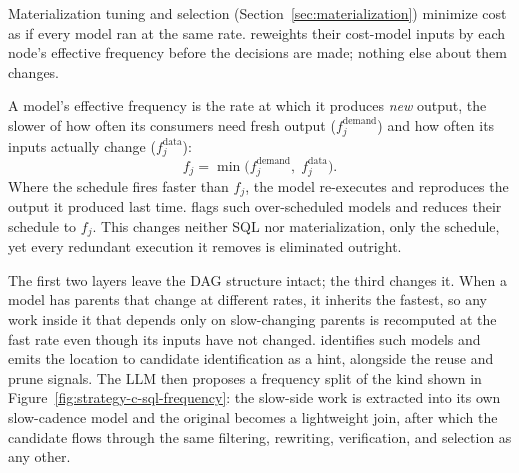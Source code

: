 Materialization tuning and selection (Section~\ref{sec:materialization}) minimize cost as if every model ran at the same rate. \tool{} reweights their cost-model inputs by each node's effective frequency before the decisions are made; nothing else about them changes.

A model's effective frequency is the rate at which it produces \emph{new} output, the slower of how often its consumers need fresh output ($f^{\text{demand}}_j$) and how often its inputs actually change ($f^{\text{data}}_j$):
\begin{equation*}
f_j = \min\!\big(f^{\text{demand}}_j,\; f^{\text{data}}_j\big).
\end{equation*}
Where the schedule fires faster than $f_j$, the model re-executes and reproduces the output it produced last time. \tool{} flags such over-scheduled models and reduces their schedule to $f_j$. This changes neither SQL nor materialization, only the schedule, yet every redundant execution it removes is eliminated outright.

The first two layers leave the DAG structure intact; the third changes it. When a model has parents that change at different rates, it inherits the fastest, so any work inside it that depends only on slow-changing parents is recomputed at the fast rate even though its inputs have not changed. \tool{} identifies such models and emits the location to candidate identification as a hint, alongside the reuse and prune signals. The LLM then proposes a frequency split of the kind shown in Figure~\ref{fig:strategy-c-sql-frequency}: the slow-side work is extracted into its own slow-cadence model and the original becomes a lightweight join, after which the candidate flows through the same filtering, rewriting, verification, and selection as any other.
